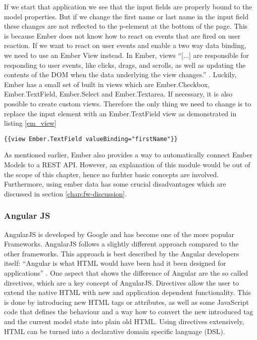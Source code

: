 If we start that application we see that the input fields are properly bound to the model properties.
But if we change the first name or last name in the input field these changes are not reflected to the p-element at the bottom of the page.
This is because Ember does not know how to react on events that are fired on user reaction.
If we want to react on user events and enable a two way data binding,  we need to use an Ember View instead. In Ember, views
\enquote{[...] are responsible for responding to user events, like clicks, drags, and scrolls, as well as updating the contents of the DOM when the data underlying the view changes.} \autocite{tech-ana:em-views}.
Luckily, Ember has a small set of built in views which are Ember.Checkbox, Ember.TextField, Ember.Select and Ember.Textarea.
If necessary, it is also possible to create custom views.
Therefore the only thing we need to change is to replace the input element with an Ember.TextField view as demonstrated in listing \ref{em_view}

\begin{lstlisting}[label=em_view,caption=Ember Views]
	{{view Ember.TextField valueBinding="firstName"}}
\end{lstlisting}

As mentioned earlier, Ember also provides a way to automatically connect Ember Models to a REST API. However, an explanation of this module would be out of the scope of this chapter, hence no furhter basic concepts are involved. Furthermore, using ember data has some crucial disadvantages which are discussed in section \ref{chap:fw-discussion}.

\subsubsection{Angular JS}  

AngularJS  is developed by Google and has become one of the more popular Frameworks.
AngularJS follows a slightly different approach compared to the other frameworks.
This approach is best described by the Angular developers itself: \enquote{Angular is what HTML would have been had it been designed for applications} \autocite{tech-ana:ng-intro}.
One aspect that shows the difference of Angular are the so called directives, which are a key concept of AngularJS.
Directives allow the user to extend the native HTML with new and application dependent functionality.
This is done by introducing new HTML tags or attributes, as well as some JavaScript code that defines the behaviour and a way how to convert the new introduced tag and the current model state into plain old HTML. Using directives extensively, HTML can be turned into a declarative domain specific language (DSL).

